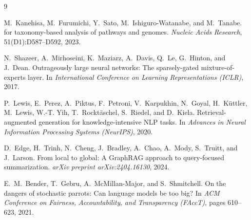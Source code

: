 \documentclass{article}
\begin{document}

\begin{thebibliography}{9}

M.~Kanehisa, M.~Furumichi, Y.~Sato, M.~Ishiguro-Watanabe, and M.~Tanabe.
 for taxonomy-based analysis of pathways and genomes.
\newblock \emph{Nucleic Acids Research}, 51(D1):D587--D592, 2023.

N.~Shazeer, A.~Mirhoseini, K.~Maziarz, A.~Davis, Q.~Le, G.~Hinton, and
  J.~Dean.
\newblock Outrageously large neural networks: The sparsely-gated mixture-of-experts layer.
\newblock In \emph{International Conference on Learning Representations (ICLR)}, 2017.

P.~Lewis, E.~Perez, A.~Piktus, F.~Petroni, V.~Karpukhin, N.~Goyal,
  H.~K{\"u}ttler, M.~Lewis, W.-T. Yih, T.~Rockt{\"a}schel, S.~Riedel, and
  D.~Kiela.
\newblock Retrieval-augmented generation for knowledge-intensive {NLP} tasks.
\newblock In \emph{Advances in Neural Information Processing Systems (NeurIPS)},
  2020.

D.~Edge, H.~Trinh, N.~Cheng, J.~Bradley, A.~Chao, A.~Mody, S.~Truitt, and
  J.~Larson.
\newblock From local to global: A {GraphRAG} approach to query-focused
  summarization.
\newblock \emph{arXiv preprint arXiv:2404.16130}, 2024.

E.~M.~Bender, T.~Gebru, A.~McMillan-Major, and S.~Shmitchell.
\newblock On the dangers of stochastic parrots: Can language models be too big?
\newblock In \emph{ACM Conference on Fairness, Accountability, and Transparency
  (FAccT)}, pages 610--623, 2021.

\end{thebibliography}
\end{document}
